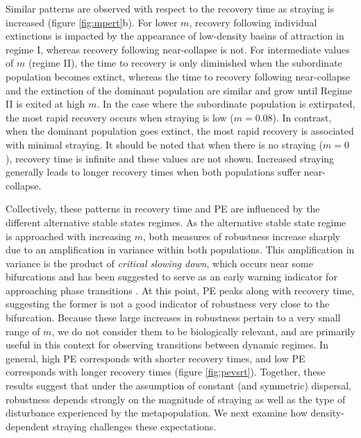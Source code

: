 \documentclass{revtex4}
\begin{document}
Similar patterns are observed with respect to the recovery time as straying is increased (figure \ref{fig:mpert}b).
For lower $m$, recovery following individual extinctions is impacted by the appearance of low-density basins of attraction in regime I, whereas recovery following near-collapse is not.
For intermediate values of $m$ (regime II), the time to recovery is only diminished when the subordinate population becomes extinct, whereas the time to recovery following near-collapse and the extinction of the dominant population are similar and grow until Regime II is exited at high $m$.
In the case where the subordinate population is extirpated, the most rapid recovery occurs when straying is low ($m = 0.08$). 
In contrast, when the dominant population goes extinct, the most rapid recovery is associated with minimal straying. 
It should be noted that when there is no straying ($m = 0$), recovery time is infinite and these values are not shown. 
Increased straying generally leads to longer recovery times when both populations suffer near-collapse.


Collectively, these patterns in recovery time and PE are influenced by the different alternative stable states regimes. 
As the alternative stable state regime is approached with increasing $m$, both measures of robustness increase sharply due to an amplification in variance within both populations.
This amplification in variance is the product of \emph{critical slowing down}, which occurs near some bifurcations \citep{Scheffer:2009gg} and has been suggested to serve as an early warning indicator for approaching phase transitions \citep{Scheffer:2009gg,Lade:2012eu,Anonymous:2013br,Dakos:2014br,Krkosek:2014ch}.
At this point, PE peaks along with recovery time, suggesting the former is not a good indicator of robustness very close to the bifurcation.
Because these large increases in robustness pertain to a very small range of $m$, we do not consider them to be biologically relevant, and are primarily useful in this context for observing transitions between dynamic regimes.
In general, high PE corresponds with shorter recovery times, and low PE corresponds with longer recovery times (figure \ref{fig:pevsrt}).
Together, these results suggest that under the assumption of constant (and symmetric) dispersal, robustness depends strongly on the magnitude of straying as well as the type of disturbance experienced by the metapopulation.
We next examine how density-dependent straying challenges these expectations.\\
\end{document}
